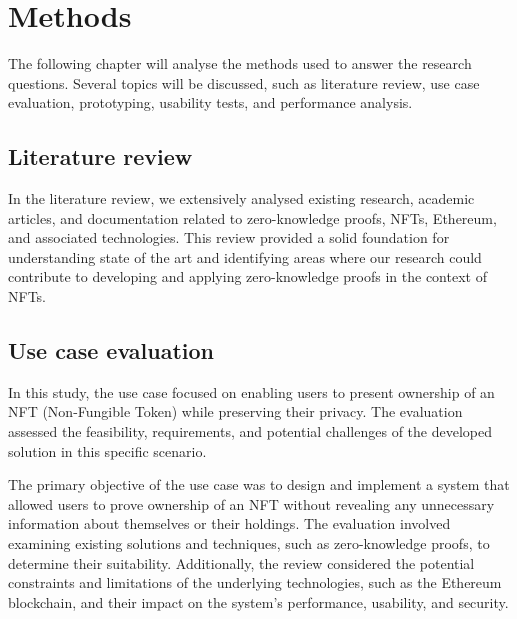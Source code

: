 \chapter{Methods}
The following chapter will analyse the methods used to answer the research questions. Several topics will be discussed, such as literature review, use case evaluation, prototyping, usability tests, and performance analysis.

\section{Literature review}
In the literature review, we extensively analysed existing research, academic articles, and documentation related to zero-knowledge proofs, \ac{NFT}s, Ethereum, and associated technologies. This review provided a solid foundation for understanding state of the art and identifying areas where our research could contribute to developing and applying zero-knowledge proofs in the context of \ac{NFT}s.

\section{Use case evaluation}
In this study, the use case focused on enabling users to present ownership of an \ac{NFT} (Non-Fungible Token) while preserving their privacy. The evaluation assessed the feasibility, requirements, and potential challenges of the developed solution in this specific scenario.

The primary objective of the use case was to design and implement a system that allowed users to prove ownership of an \ac{NFT} without revealing any unnecessary information about themselves or their holdings. The evaluation involved examining existing solutions and techniques, such as zero-knowledge proofs, to determine their suitability. Additionally, the review considered the potential constraints and limitations of the underlying technologies, such as the Ethereum blockchain, and their impact on the system's performance, usability, and security.

